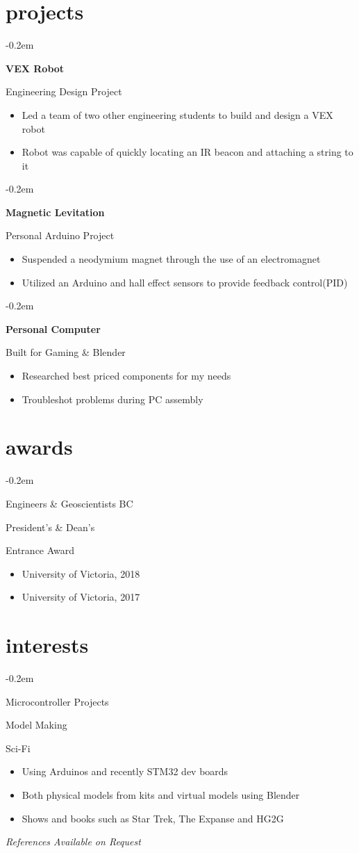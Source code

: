 \documentclass{article}
\newcommand{\ritem}[1]{
\item\hfill {#1}
}
\newcommand{\fancybullet}[2]{
{ {


\parbox[t]{5.5cm}{
\begin{minipage}[t]{5.5cm}
   \begin{list}{\quad}{}
   \itemsep-0.2em 
     #1
   \end{list}
\end{minipage}
}  
\parbox[t]{13cm}{
\begin{minipage}[t]{13cm}
   \begin{itemize}
   \itemsep-0.2em 
     #2
   \end{itemize}
\end{minipage}
}}\newline}
}
\begin{document}
\section{projects}
\fancybullet{
\ritem{\bfseries{VEX Robot}}
\ritem{Engineering Design Project}
}
{
\item Led a team of two other engineering students to build and design a VEX robot
\item Robot was capable of quickly locating an IR beacon and attaching a string to it
}
\vspace{0.3em}
\fancybullet{
\ritem{\bfseries{Magnetic Levitation}}
\ritem{Personal Arduino Project}
}
{
\item Suspended a neodymium magnet through the use of an electromagnet  
\item Utilized an Arduino and hall effect sensors to provide feedback control(PID) 
}
\vspace{0.3em}

\vspace{0.3em}
\fancybullet{
\ritem{\bfseries{Personal Computer}}
\ritem{Built for Gaming \& Blender}
}
{
\item Researched best priced components for my needs
\item Troubleshot problems during PC assembly
}


\section{awards}

\fancybullet{
\ritem{Engineers \& Geoscientists BC}
\ritem{President's \& Dean's}
\ritem{Entrance Award}
}
{
\item University of Victoria, 2018
\item University of Victoria, 2017
}


\section{interests}

\fancybullet{
\ritem{Microcontroller Projects}
\ritem{Model Making}
\ritem{Sci-Fi}
}
{
\item Using Arduinos and recently STM32 dev boards
\item Both physical models from kits and virtual models using Blender
\item Shows and books such as Star Trek, The Expanse and HG2G
}
\vfill
\textit{References Available on Request}
\end{document}
